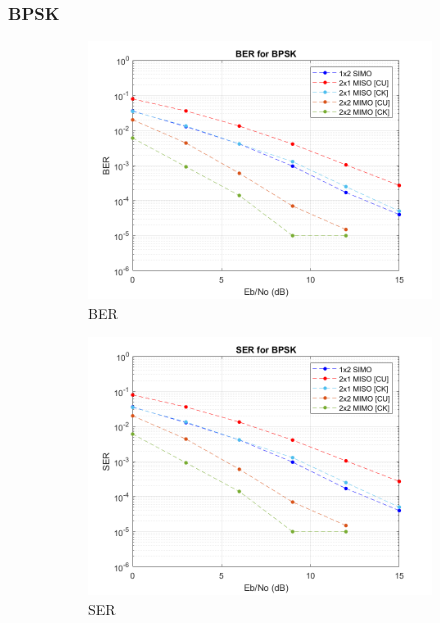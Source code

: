 \documentclass{article}
\begin{document}
\subsubsection{BPSK}
\begin{figure}[H]
	\centering
	\begin{subfigure}{0.5\textwidth}
		\centerline{\includegraphics[width=1\textwidth]{2qamber.png}}
		\caption{BER}
	\end{subfigure}%
	\begin{subfigure}{0.5\textwidth}
		\centerline{\includegraphics[width=1\textwidth]{2qamser.png}}
		\caption{SER}
	\end{subfigure}\\%
	\caption{}
\end{figure}
\end{document}
